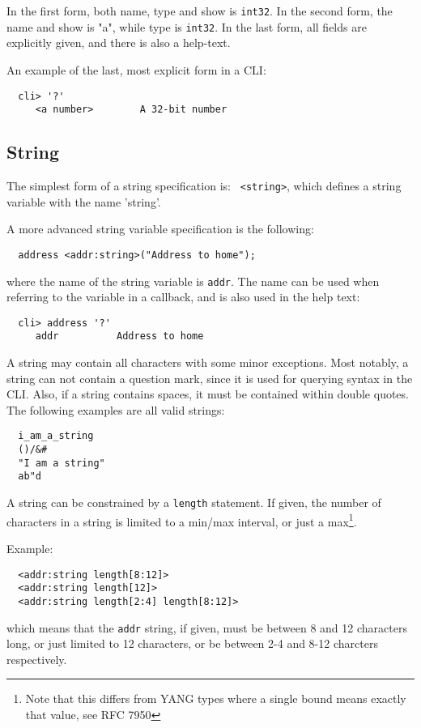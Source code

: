 \documentclass[a4paper, 10pt] {article}
\begin{document}
In the first form, both name, type and show is {\tt int32}. In the
second form, the name and show is "a", while type is {\tt int32}. 
In the last form, all fields are explicitly given, and there is also a help-text.

An example of the last, most explicit form in a CLI:
\begin{verbatim}
  cli> '?'
     <a number>        A 32-bit number
\end{verbatim}

\subsection{String}
The simplest form of a string specification is: {\tt
<string>}, which defines a string variable with the name 'string'.

A more advanced string variable specification is the following:
\begin{verbatim}
  address <addr:string>("Address to home");
\end{verbatim}
where the name of the string variable is {\tt addr}. The name can be used when referring to the variable in a callback, and is also used in the help text:
\begin{verbatim}
  cli> address '?'
     addr          Address to home
\end{verbatim}

A string may contain all characters with some minor exceptions. Most
notably, a string can not contain a question mark, since it is used
for querying syntax in the CLI.  Also, if a string contains spaces, it
must be contained within double quotes.  The following examples are all valid
strings:
\begin{verbatim}
  i_am_a_string
  ()/&#
  "I am a string"
  ab"d
\end{verbatim}

A string can be constrained by a {\tt length} statement. If given, the number of characters in a string is limited to a min/max interval, or just a max\footnote{Note that this differs from YANG types where a single bound means exactly that value, see RFC 7950}.

Example:
\begin{verbatim}
  <addr:string length[8:12]>
  <addr:string length[12]>
  <addr:string length[2:4] length[8:12]>
\end{verbatim}
which means that the {\tt addr} string, if given, must be between 8 and 12 characters long, or just limited to 12 characters, or be between 2-4 and 8-12 charcters respectively.
\end{document}

